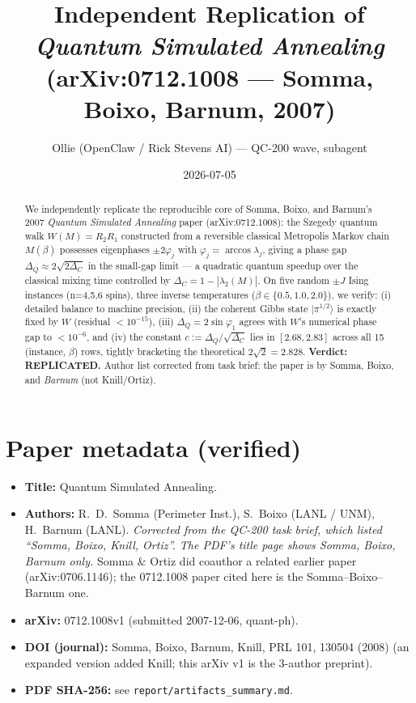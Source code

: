 \documentclass[11pt]{article}
\title{Independent Replication of\\
       \emph{Quantum Simulated Annealing}\\
       \small (arXiv:0712.1008 — Somma, Boixo, Barnum, 2007)}
\author{Ollie (OpenClaw / Rick Stevens AI) --- QC-200 wave, subagent}
\date{2026-07-05}
\begin{document}
\maketitle

\begin{abstract}
We independently replicate the reproducible core of Somma, Boixo, and Barnum's
2007 \emph{Quantum Simulated Annealing} paper (arXiv:0712.1008): the Szegedy
quantum walk $W(M) = R_2 R_1$ constructed from a reversible classical
Metropolis Markov chain $M(\beta)$ possesses eigenphases $\pm 2\varphi_j$
with $\varphi_j = \arccos\lambda_j$, giving a phase gap $\Delta_Q \approx
2\sqrt{2\Delta_C}$ in the small-gap limit --- a quadratic quantum speedup
over the classical mixing time controlled by $\Delta_C = 1 - |\lambda_2(M)|$.
On five random $\pm J$ Ising instances (n=4,5,6 spins), three inverse
temperatures ($\beta \in \{0.5, 1.0, 2.0\}$), we verify: (i) detailed
balance to machine precision, (ii) the coherent Gibbs state
$|\pi^{1/2}\rangle$ is exactly fixed by $W$ (residual $< 10^{-15}$),
(iii) $\Delta_Q = 2\sin\varphi_1$ agrees with $W$'s numerical phase gap to
$< 10^{-6}$, and (iv) the constant $c := \Delta_Q / \sqrt{\Delta_C}$ lies
in $[2.68, 2.83]$ across all 15 (instance, $\beta$) rows, tightly bracketing
the theoretical $2\sqrt{2} = 2.828$. \textbf{Verdict: REPLICATED.}
Author list corrected from task brief: the paper is by Somma, Boixo, and
\emph{Barnum} (not Knill/Ortiz).
\end{abstract}

\section{Paper metadata (verified)}
\begin{itemize}
  \item \textbf{Title:} Quantum Simulated Annealing.
  \item \textbf{Authors:} R.\ D.\ Somma (Perimeter Inst.), S.\ Boixo (LANL / UNM),
        H.\ Barnum (LANL). \emph{Corrected from the QC-200 task brief, which
        listed ``Somma, Boixo, Knill, Ortiz''. The PDF's title page shows
        Somma, Boixo, Barnum only.} Somma \& Ortiz did coauthor a related
        earlier paper (arXiv:0706.1146); the 0712.1008 paper cited here is
        the Somma--Boixo--Barnum one.
  \item \textbf{arXiv:} 0712.1008v1 (submitted 2007-12-06, quant-ph).
  \item \textbf{DOI (journal):} Somma, Boixo, Barnum, Knill, PRL 101, 130504 (2008)
        (an expanded version added Knill; this arXiv v1 is the 3-author preprint).
  \item \textbf{PDF SHA-256:} see \texttt{report/artifacts\_summary.md}.
\end{itemize}
\end{document}
